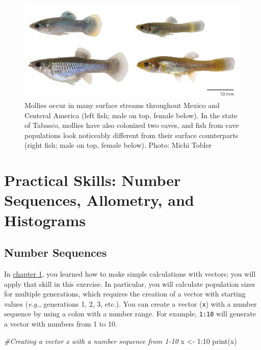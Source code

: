 \documentclass[
]{book}
\newenvironment{Shaded}{\begin{snugshade}}{\end{snugshade}}
\newcommand{\CommentTok}[1]{\textcolor[rgb]{0.56,0.35,0.01}{\textit{#1}}}
\newcommand{\DecValTok}[1]{\textcolor[rgb]{0.00,0.00,0.81}{#1}}
\newcommand{\FunctionTok}[1]{\textcolor[rgb]{0.00,0.00,0.00}{#1}}
\newcommand{\NormalTok}[1]{#1}
\newcommand{\OtherTok}[1]{\textcolor[rgb]{0.56,0.35,0.01}{#1}}
\newcommand{\SpecialCharTok}[1]{\textcolor[rgb]{0.00,0.00,0.00}{#1}}
\begin{document}
\begin{figure}
\includegraphics[width=1\linewidth]{images/mollies} \caption{Mollies occur in many surface streams throughout Mexico and Centeral America (left fish; male on top, female below). In the state of Tabasco, mollies have also colonized two caves, and fish from cave populations look noticeably different from their surface counterparts (right fish; male on top, female below). Photo: Michi Tobler}\label{fig:mollies}
\end{figure}

\hypertarget{practical-skills-number-sequences-allometry-and-histograms}{%
\section{Practical Skills: Number Sequences, Allometry, and Histograms}\label{practical-skills-number-sequences-allometry-and-histograms}}

\hypertarget{number-sequences}{%
\subsection{Number Sequences}\label{number-sequences}}

In \href{what-evolution-is.html\#some-r-and-rstudio-basics2}{chapter 1}, you learned how to make simple calculations with vectors; you will apply that skill in this exercise. In particular, you will calculate population sizes for multiple generations, which requires the creation of a vector with starting values (\emph{e.g.}, generations 1, 2, 3, etc.). You can create a vector (\texttt{x}) with a number sequence by using a colon with a number range. For example, \texttt{1:10} will generate a vector with numbers from 1 to 10.

\begin{Shaded}
\begin{Highlighting}[]
\CommentTok{\#Creating a vector x with a number sequence from 1{-}10}
\NormalTok{x }\OtherTok{\textless{}{-}} \DecValTok{1}\SpecialCharTok{:}\DecValTok{10}
\FunctionTok{print}\NormalTok{(x)}
\end{Highlighting}
\end{Shaded}
\end{document}
